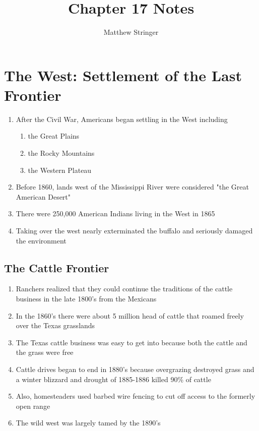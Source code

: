 \documentclass[12pt]{article} %
\title{Chapter 17 Notes} %
\author{Matthew Stringer} %
\begin{document}
\maketitle
\tableofcontents
\newpage

\section{The West: Settlement of the Last Frontier}
\begin{enumerate}
	\item After the Civil War, Americans began settling in the West including
	\begin{enumerate}
		\item the Great Plains
		\item the Rocky Mountains
		\item the Western Plateau
	\end{enumerate}
	\item Before 1860, lands west of the Mississippi River were considered "the Great American Desert"
	\item There were 250,000 American Indians living in the West in 1865
	\item Taking over the west nearly exterminated the buffalo and seriously damaged the environment
\end{enumerate}

\subsection{The Cattle Frontier}
\begin{enumerate}
	\item Ranchers realized that they could continue the traditions of the cattle business in the 
		late 1800's from the Mexicans
	\item In the 1860's there were about 5 million head of cattle that roamed freely over the Texas
		grasslands
	\item The Texas cattle business was easy to get into because both the cattle and the grass were
		free
	\item Cattle drives began to end in 1880's because overgrazing destroyed grass and a winter 
		blizzard and drought of 1885-1886 killed 90\% of cattle
	\item Also, homesteaders used barbed wire fencing to cut off access to the formerly open range
	\item The wild west was largely tamed by the 1890's
\end{enumerate}
\end{document}
